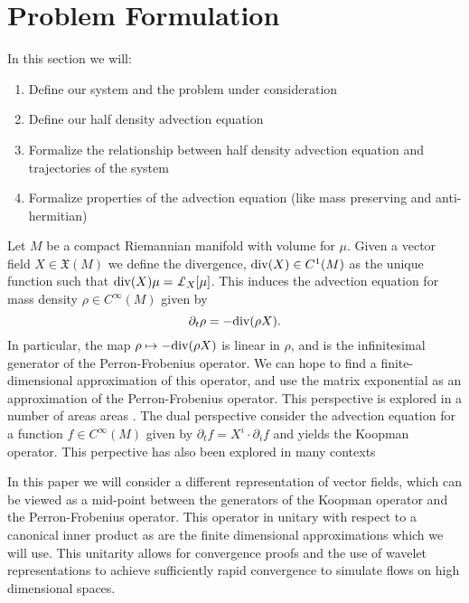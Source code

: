\section{Problem Formulation}\label{sec:Formulation}
In this section we will:
\begin{enumerate}
	\item Define our system and the problem under consideration
	\item Define our half density advection equation
	\item Formalize the relationship between half density advection equation and trajectories of the system
	\item Formalize properties of the advection equation (like mass preserving and anti-hermitian)
\end{enumerate}

Let $M$ be a compact Riemannian manifold with volume for $\mu$.  Given a vector field $X \in \mathfrak{X}(M)$ we define the divergence, ${\rm div}(X) \in C^1(M)$ as the unique function such that ${\rm div}(X) \mu = \pounds_X [ \mu ]$.
This induces the advection equation for mass density $\rho \in C^{\infty}(M)$ given by
\[
	\partial_t \rho = - {\rm div}( \rho X ).
\]
In particular, the map $\rho \mapsto - {\rm div}( \rho X)$ is linear in $\rho$, and is the infinitesimal generator of the Perron-Frobenius operator.
We can hope to find a finite-dimensional approximation of this operator, and use the matrix exponential as an approximation of the Perron-Frobenius operator.
This perspective is explored in a number of areas areas \cite{FroylandJungeKoltai2013,FroylandPadberg2009}.
The dual perspective consider the advection equation for a function $f \in C^{\infty}(M)$ given by $\partial_t f = X^i \cdot \partial_i f$ and yields the Koopman operator.
This perpective has also been explored in many contexts \cite{RowleyMezic2009,Mezic2005}

In this paper we will consider a different representation of vector fields, which can be viewed as a mid-point between the generators of the Koopman operator and the Perron-Frobenius operator.
This operator in unitary with respect to a canonical inner product as are the finite dimensional approximations which we will use.
This unitarity allows for convergence proofs and the use of wavelet representations to achieve sufficiently rapid convergence to simulate flows on high dimensional spaces.


